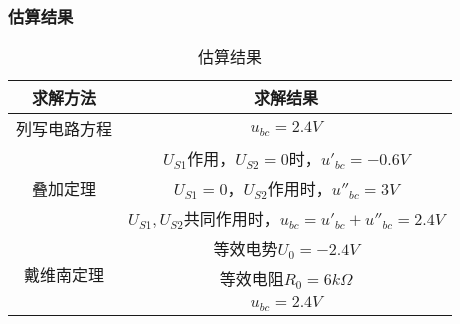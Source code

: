 \documentclass[12pt,a4paper,oneside,left=3.18,right=3.18,top=2.54,bottom=2.54]{ctexart}
\begin{document}
		\subsubsection{估算结果}
		\begin{table}[H]
		\centering
		\begin{tabular}{|c|c|}
		\hline
		求解方法&求解结果\\
		\hline
		列写电路方程&$u_{bc}=2.4V$\\
		\hline
		\multirow{3}{*}{叠加定理}&$U_{S1}$作用，$U_{S2}=0$时，$u'_{bc}=-0.6V$\\
		\multirow{3}{*}{}&$U_{S1}=0$，$U_{S2}$作用时，$u''_{bc}=3V$\\
		\multirow{3}{*}{}&$U_{S1},U_{S2}$共同作用时，$u_{bc}=u'_{bc}+u''_{bc}=2.4V$\\
		\hline
		\multirow{3}{*}{戴维南定理}&等效电势$U_{0}=-2.4V$\\
		\multirow{3}{*}{}&等效电阻$R_{0}=6k\Omega$\\
		\multirow{3}{*}{}&$u_{bc}=2.4V$\\
		\hline
		\end{tabular}
		\caption{估算结果}
		\label{table1}
		\end{table}
		\par
		
\end{document}
